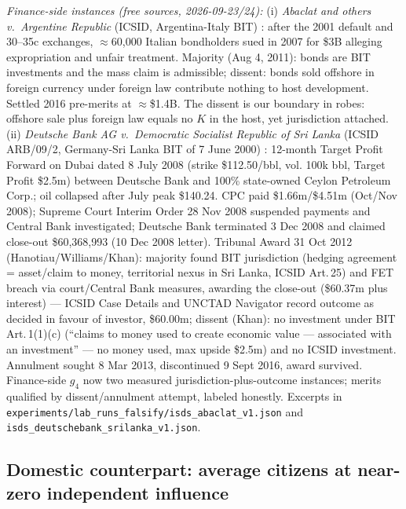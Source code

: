 \documentclass[11pt]{article}
\begin{document}
\textit{Finance-side instances (free sources, 2026-09-23/24):} (i) \textit{Abaclat and others v.\ Argentine Republic} (ICSID, Argentina-Italy BIT) \citep{abaclat2016}: after the 2001 default and 30--35c exchanges, $\approx$60,000 Italian bondholders sued in 2007 for \$3B alleging expropriation and unfair treatment. Majority (Aug 4, 2011): bonds are BIT investments and the mass claim is admissible; dissent: bonds sold offshore in foreign currency under foreign law contribute nothing to host development. Settled 2016 pre-merits at $\approx$\$1.4B. The dissent is our boundary in robes: offshore sale plus foreign law equals no $K$ in the host, yet jurisdiction attached. (ii) \textit{Deutsche Bank AG v.\ Democratic Socialist Republic of Sri Lanka} (ICSID ARB/09/2, Germany-Sri Lanka BIT of 7 June 2000) \citep{deutsche2012}: 12-month Target Profit Forward on Dubai dated 8 July 2008 (strike \$112.50/bbl, vol. 100k bbl, Target Profit \$2.5m) between Deutsche Bank and 100\% state-owned Ceylon Petroleum Corp.; oil collapsed after July peak \$140.24. CPC paid \$1.66m/\$4.51m (Oct/Nov 2008); Supreme Court Interim Order 28 Nov 2008 suspended payments and Central Bank investigated; Deutsche Bank terminated 3 Dec 2008 and claimed close-out \$60,368,993 (10 Dec 2008 letter). Tribunal Award 31 Oct 2012 (Hanotiau/Williams/Khan): majority found BIT jurisdiction (hedging agreement = asset/claim to money, territorial nexus in Sri Lanka, ICSID Art.\,25) and FET breach via court/Central Bank measures, awarding the close-out (\$60.37m plus interest) --- ICSID Case Details and UNCTAD Navigator record outcome as decided in favour of investor, \$60.00m; dissent (Khan): no investment under BIT Art.\,1(1)(c) (``claims to money used to create economic value --- associated with an investment'' --- no money used, max upside \$2.5m) and no ICSID investment. Annulment sought 8 Mar 2013, discontinued 9 Sept 2016, award survived. Finance-side $g_4$ now two measured jurisdiction-plus-outcome instances; merits qualified by dissent/annulment attempt, labeled honestly. Excerpts in \texttt{experiments/lab\_runs\_falsify/isds\_abaclat\_v1.json} and \texttt{isds\_deutschebank\_srilanka\_v1.json}.

\subsection{Domestic counterpart: average citizens at near-zero independent influence}
\end{document}
